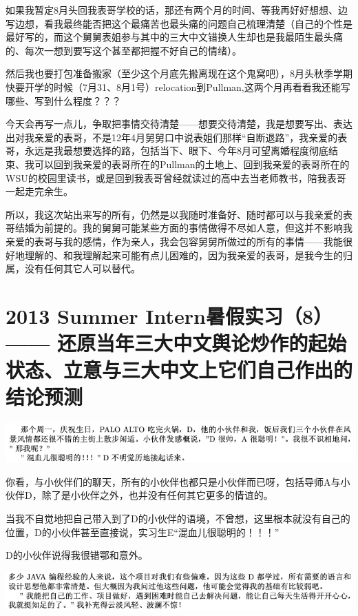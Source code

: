 \documentclass[9pt, b5paper]{article}
\begin{document}
如果我暂定8月头回我表哥学校的话，那还有两个月的时间、等我再好好想想、边写边想，看我最终能否把这个最痛苦也最头痛的问题自己梳理清楚（自己的个性是最好写的，而这个舅舅表姐参与其中的三大中文错换人生却也是我最陌生最头痛的、每次一想到要写这个甚至都把握不好自己的情绪）。

然后我也要打包准备搬家（至少这个月底先搬离现在这个鬼窝吧），8月头秋季学期快要开学的时候（7月31、8月1号）relocation到Pullman,这两个月再看看我还能写哪些、写到什么程度？？？

今天会再写一点儿，争取把事情交待清楚——想要交待清楚，我是想要写出、表达出对我亲爱的表哥，不是12年4月舅舅口中说表姐们那样“自断退路”，我亲爱的表哥，永远是我最想要选择的路，包括当下、眼下、今年8月可望离婚程度彻底结束、我可以回到我亲爱的表哥所在的Pullman的土地上、回到我亲爱的表哥所在的WSU的校园里读书，或是回到我表哥曾经就读过的高中去当老师教书，陪我表哥一起走完余生。

所以，我这次站出来写的所有，仍然是以我随时准备好、随时都可以与我亲爱的表哥结婚为前提的。我的舅舅可能某些方面的事情做得不尽如人意，但这并不影响我亲爱的表哥与我的感情，作为亲人，我会包容舅舅所做过的所有的事情——我能很好地理解的、和我理解起来可能有点儿困难的，因为我亲爱的表哥，是我今生的归属，没有任何其它人可以替代。 

\section{2013 Summer Intern暑假实习（8）—— 还原当年三大中文舆论炒作的起始状态、立意与三大中文上它们自己作出的结论预测}
\label{sec:org5ce635f}

\begin{center}
\includegraphics[width=.9\linewidth]{./pic/backups_plans_20210514_121334.png}
\end{center}

你看，与小伙伴们的聊天，所有的小伙伴也都只是小伙伴而已呀，包括导师A与小伙伴D，除了是小伙伴之外，也并没有任何其它更多的情谊的。 

当我不自觉地把自己带入到了D的小伙伴的语境，不曾想，这里根本就没有自己的位置，D的小伙伴甚至直接说，实习生E“混血儿很聪明的！！！”

D的小伙伴说得我很错鄂和意外。 

\begin{center}
\includegraphics[width=.9\linewidth]{./pic/backups_plans_20210514_121704.png}
\end{center}
\end{document}

